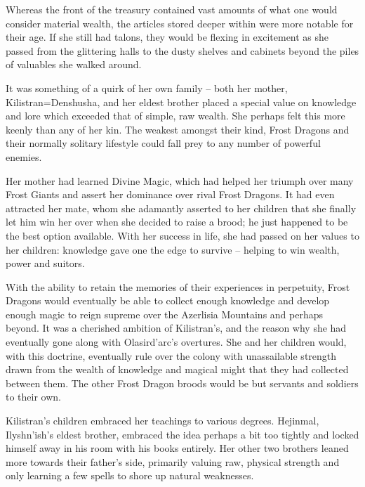  

Whereas the front of the treasury contained vast amounts of what one would consider material wealth, the articles stored deeper within were more notable for their age. If she still had talons, they would be flexing in excitement as she passed from the glittering halls to the dusty shelves and cabinets beyond the piles of valuables she walked around.

 

It was something of a quirk of her own family – both her mother, Kilistran=Denshusha, and her eldest brother placed a special value on knowledge and lore which exceeded that of simple, raw wealth. She perhaps felt this more keenly than any of her kin. The weakest amongst their kind, Frost Dragons and their normally solitary lifestyle could fall prey to any number of powerful enemies.

 

Her mother had learned Divine Magic, which had helped her triumph over many Frost Giants and assert her dominance over rival Frost Dragons. It had even attracted her mate, whom she adamantly asserted to her children that she finally let him win her over when she decided to raise a brood; he just happened to be the best option available. With her success in life, she had passed on her values to her children: knowledge gave one the edge to survive – helping to win wealth, power and suitors.

 

With the ability to retain the memories of their experiences in perpetuity, Frost Dragons would eventually be able to collect enough knowledge and develop enough magic to reign supreme over the Azerlisia Mountains and perhaps beyond. It was a cherished ambition of Kilistran’s, and the reason why she had eventually gone along with Olasird’arc’s overtures. She and her children would, with this doctrine, eventually rule over the colony with unassailable strength drawn from the wealth of knowledge and magical might that they had collected between them. The other Frost Dragon broods would be but servants and soldiers to their own.

 

Kilistran’s children embraced her teachings to various degrees. Hejinmal, Ilyshn’ish’s eldest brother, embraced the idea perhaps a bit too tightly and locked himself away in his room with his books entirely. Her other two brothers leaned more towards their father’s side, primarily valuing raw, physical strength and only learning a few spells to shore up natural weaknesses.

